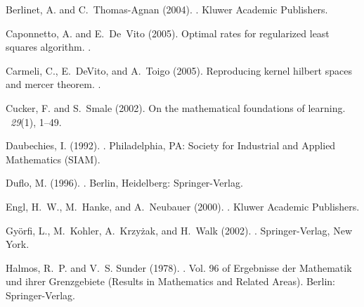 \documentclass[twoside,11pt]{amsart}
\theoremstyle{theorem}
\theoremstyle{definition}
\theoremstyle{remark}
\begin{document}

%

\begin{thebibliography}{}

{\sc Berlinet, A.} and {\sc C.~Thomas-Agnan} (2004).
.
\newblock Kluwer Academic Publishers.

{\sc Caponnetto, A.} and {\sc E.~De{~V}ito} (2005).
\newblock Optimal rates for regularized least squares algorithm.
.

{\sc Carmeli, C.}, {\sc E.~DeVito}, and {\sc A.~Toigo} (2005).
\newblock Reproducing kernel hilbert spaces and mercer theorem.
.

{\sc Cucker, F.} and {\sc S.~Smale} (2002).
\newblock On the mathematical foundations of learning.
~{\em 29\/}(1), 1--49.

{\sc Daubechies, I.} (1992).
.
\newblock Philadelphia, PA: Society for Industrial and Applied Mathematics
  (SIAM).

{\sc Duflo, M.} (1996).
.
\newblock Berlin, Heidelberg: Springer-Verlag.

{\sc Engl, H.~W.}, {\sc M.~Hanke}, and {\sc A.~Neubauer} (2000).
.
\newblock Kluwer Academic Publishers.

{\sc Gy\"{o}rfi, L.}, {\sc M.~Kohler}, {\sc A.~Krzy\.{z}ak}, and {\sc H.~Walk}
  (2002).
.
\newblock Springer-Verlag, New York.

{\sc Halmos, R.~P.} and {\sc V.~S. Sunder} (1978).
.
\newblock Vol. 96 of Ergebnisse der Mathematik und ihrer Grenzgebiete (Results
  in Mathematics and Related Areas). Berlin: Springer-Verlag.


\end{thebibliography}
\end{document}
